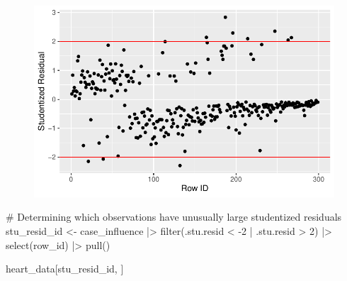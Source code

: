 \documentclass[
  letterpaper,
  DIV=11,
  numbers=noendperiod]{scrartcl}
\newenvironment{Shaded}{\begin{snugshade}}{\end{snugshade}}
\newcommand{\CommentTok}[1]{\textcolor[rgb]{0.37,0.37,0.37}{#1}}
\newcommand{\DecValTok}[1]{\textcolor[rgb]{0.68,0.00,0.00}{#1}}
\newcommand{\FunctionTok}[1]{\textcolor[rgb]{0.28,0.35,0.67}{#1}}
\newcommand{\NormalTok}[1]{\textcolor[rgb]{0.00,0.23,0.31}{#1}}
\newcommand{\OtherTok}[1]{\textcolor[rgb]{0.00,0.23,0.31}{#1}}
\newcommand{\SpecialCharTok}[1]{\textcolor[rgb]{0.37,0.37,0.37}{#1}}
\begin{document}
\begin{figure}[H]

{\centering \includegraphics{SDS-291-final-project-report_files/figure-pdf/unnamed-chunk-9-2.pdf}

}

\end{figure}

\begin{Shaded}
\begin{Highlighting}[]
\CommentTok{\# Determining which observations have unusually large studentized residuals}
\NormalTok{stu\_resid\_id }\OtherTok{\textless{}{-}}\NormalTok{ case\_influence }\SpecialCharTok{|\textgreater{}}
  \FunctionTok{filter}\NormalTok{(.stu.resid }\SpecialCharTok{\textless{}} \SpecialCharTok{{-}}\DecValTok{2} \SpecialCharTok{|}\NormalTok{ .stu.resid }\SpecialCharTok{\textgreater{}} \DecValTok{2}\NormalTok{) }\SpecialCharTok{|\textgreater{}}
  \FunctionTok{select}\NormalTok{(row\_id) }\SpecialCharTok{|\textgreater{}}
  \FunctionTok{pull}\NormalTok{()}

\NormalTok{heart\_data[stu\_resid\_id, ]}
\end{Highlighting}
\end{Shaded}
\end{document}
